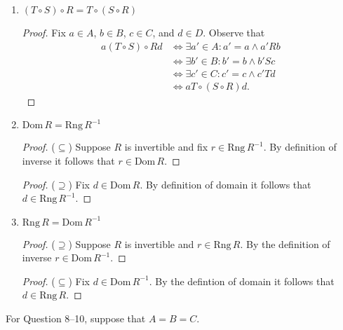 \documentclass{article}
\begin{document}
\begin{enumerate}
    \item $(T \circ S) \circ R = T \circ (S \circ R)$
      \begin{proof}
      Fix $a\in A$, $b\in B$, $c\in C$, and $d\in D$. Observe that
        \begin{align*}
          a(T\circ S)\circ Rd &\iff \exists a'\in A: a'=a \wedge a'Rb \\
          &\iff \exists b'\in B: b'=b \wedge b'Sc \\
          &\iff \exists c'\in C: c'=c \wedge c'Td \\
	  &\iff aT\circ(S\circ R)d.
        \end{align*}
      \end{proof}
    \item $\mathrm{Dom}\,R = \mathrm{Rng}\,R^{-1}$
      \begin{proof} ($\subseteq$)
      Suppose $R$ is invertible and fix $r\in \mathrm{Rng}\,R^{-1}$. By definition of inverse it follows that $r\in \mathrm{Dom}\,R$.
      \end{proof}
      \begin{proof} ($\supseteq$)
      Fix $d\in \mathrm{Dom}\,R$. By definition of domain it follows that $d \in \mathrm{Rng}\,R^{-1}$.
      \end{proof}
    \item $\mathrm{Rng}\,R = \mathrm{Dom}\,R^{-1}$
      \begin{proof} ($\supseteq$)
      Suppose $R$ is invertible and $r\in \mathrm{Rng}\,R$. By the definition of inverse $r\in \mathrm{Dom}\,R^{-1}$.
      \end{proof}
      \begin{proof} ($\subseteq$)
      Fix $d\in \mathrm{Dom}\,R^{-1}$. By the defintion of domain it follows that $d\in \mathrm{Rng}\,R$.
      \end{proof}
  \end{enumerate}
  For Question 8–10, suppose that $A = B = C$.
\end{document}
